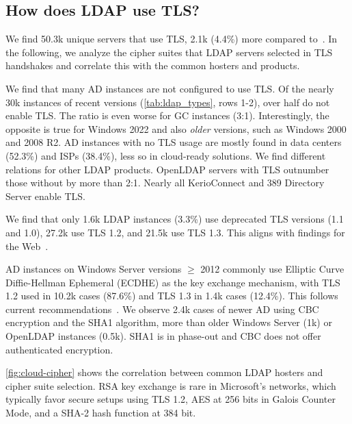 \subsection{How does LDAP use TLS?}
\label{subsec:security_practices}
We find 50.3k unique servers that use \gls{TLS}, 2.1k (4.4\%) more compared to~\cite{landscape}. In the following, we analyze the cipher suites that \gls{LDAP} servers selected in \gls{TLS} handshakes and correlate this with the common hosters and products.

We find that many \gls{AD} instances are not configured to use \gls{TLS}. Of the nearly 30k instances of recent versions (\cref{tab:ldap_types}, rows 1-2), over half do not enable \gls{TLS}. The ratio is even worse for \gls{GC} instances (3:1).
Interestingly, the opposite is true for Windows 2022 and also \textit{older} versions, such as Windows 2000 and 2008 R2. \gls{AD} instances with no \gls{TLS} usage are mostly found in data centers (52.3\%) and ISPs (38.4\%), less so in cloud-ready solutions.
We find different relations for other \gls{LDAP} products. OpenLDAP servers with \gls{TLS} outnumber those without by more than 2:1.
Nearly all KerioConnect and 389 Directory Server enable \gls{TLS}.

We find that only 1.6k \gls{LDAP} instances (3.3\%) use deprecated TLS versions (1.1 and 1.0), 27.2k use TLS 1.2, and 21.5k use TLS 1.3. This aligns with findings  for the Web~\cite{holz2020}.

\gls{AD} instances on Windows Server versions $\geq$ 2012 commonly use Elliptic Curve Diffie-Hellman Ephemeral (ECDHE) as the key exchange mechanism, with TLS 1.2 used in 10.2k cases (87.6\%) and TLS 1.3 in 1.4k cases (12.4\%). This follows current recommendations~\cite{rfc9325}. 
We observe 2.4k cases of newer \gls{AD} using \gls{CBC} encryption and the SHA1 algorithm, more than older Windows Server (1k) or OpenLDAP instances (0.5k). SHA1 is in phase-out and CBC does not offer authenticated encryption.

\cref{fig:cloud-cipher} shows the correlation between common \gls{LDAP} hosters and cipher suite selection. RSA key exchange is rare in Microsoft's networks, which typically favor secure setups using TLS 1.2, AES at 256 bits in Galois Counter Mode, and a SHA-2 hash function at 384 bit.

